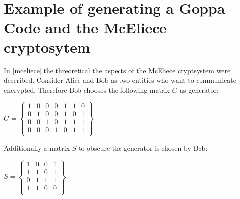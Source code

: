 
\section{Example of generating a Goppa Code and the McEliece cryptosytem}
\label{example}
In \ref{mceliece} the threoretical the aspects of the McEliece cryptsystem were described. 
\newline
Consider Alice and Bob as two entities who want to communicate encrypted. 
Therefore Bob chooses the following matrix $G$ as generator: 
\begin{center}
$
G =
\begin{Bmatrix}
1 & 0 & 0 & 0 & 1 & 1 & 0 \\
0 & 1 & 0 & 0 & 1 & 0 & 1 \\
0 & 0 & 1 & 0 & 1 & 1 & 1 \\
0 & 0 & 0 & 1 & 0 & 1 & 1 \\
\end{Bmatrix}
$
\end{center}
Additionally a matrix  $S$ to obscure the generator is chosen by Bob:
\begin{center}
	$
	S =
	\begin{Bmatrix}
	1 & 0 & 0 & 1 \\
	1 & 1 & 0 & 1 \\
	0 & 1 & 1 & 1 \\
	1 & 1 & 0 & 0 \\
	\end{Bmatrix}
	$
\end{center}

